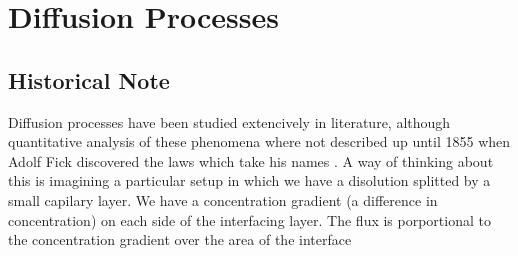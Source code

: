 \section{Diffusion Processes}

\cite{cussler}

\cite{deen}

\cite{bird}

\subsection{Historical Note}

\par Diffusion processes have been studied extencively in literature, although quantitative analysis of these phenomena where not described up until 1855 when Adolf Fick discovered the laws which take his names \cite{fick}. A way of thinking about this is imagining a particular setup in which we have a disolution  splitted by a small capilary layer. We have a concentration gradient (a difference in concentration) on each side of the interfacing layer. The flux is porportional to the concentration gradient over the area of the interface


